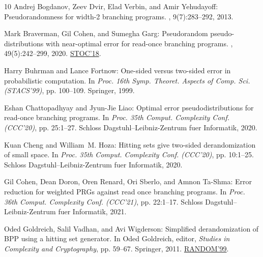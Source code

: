 \begin{thebibliography}{10}
{\sc Andrej Bogdanov, Zeev Dvir, Elad Verbin, and Amir Yehudayoff}:
  Pseudorandomness for width-2 branching programs.
, 9(7):283--292, 2013.

{\sc Mark Braverman, Gil Cohen, and Sumegha Garg}: Pseudorandom
  pseudo-distributions with near-optimal error for read-once branching
  programs.
, 49(5):242--299, 2020.
\newblock \prelim \href{https://doi.org/10.1145/3188745.3188780}{STOC'18}.

{\sc Harry Buhrman and Lance Fortnow}: One-sided versus two-sided error in
  probabilistic computation.
\newblock In {\em Proc. 16th Symp. Theoret. Aspects of Comp. Sci. (STACS'99)},
  pp. 100--109. Springer, 1999.
\newblock [\epfmtdoi{10.1007/3-540-49116-3\_9}]

{\sc Eshan Chattopadhyay and Jyun-Jie Liao}: Optimal error pseudodistributions
  for read-once branching programs.
\newblock In {\em Proc. 35th Comput. Complexity Conf. (CCC'20)}, pp. 25:1--27.
  Schloss Dagstuhl--Leibniz-Zentrum fuer Informatik, 2020.

{\sc Kuan Cheng and William~M. Hoza}: Hitting sets give two-sided
  derandomization of small space.
\newblock In {\em Proc. 35th Comput. Complexity Conf. (CCC'20)}, pp. 10:1--25.
  Schloss Dagstuhl--Leibniz-Zentrum fuer Informatik, 2020.

{\sc Gil Cohen, Dean Doron, Oren Renard, Ori Sberlo, and Amnon Ta-Shma}: Error
  reduction for weighted {PRG}s against read once branching programs.
\newblock In {\em Proc. 36th Comput. Complexity Conf. (CCC'21)}, pp. 22:1--17.
  Schloss Dagstuhl--Leibniz-Zentrum fuer Informatik, 2021.

{\sc Oded Goldreich, Salil Vadhan, and Avi Wigderson}: Simplified
  derandomization of {BPP} using a hitting set generator.
\newblock In {\sc Oded Goldreich}, editor, {\em Studies in Complexity and
  Cryptography}, pp. 59--67. Springer, 2011.
\newblock \prelim
  \href{https://doi.org/10.1007/978-3-540-48413-4\_14}{RANDOM'99}.


\end{thebibliography}
